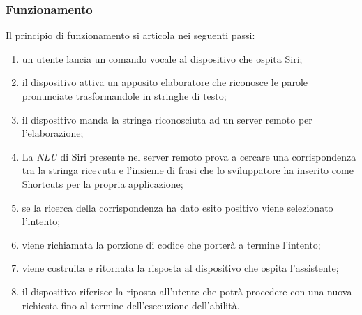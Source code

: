		\subsubsection{Funzionamento}
		Il principio di funzionamento si articola nei seguenti passi:
		\begin{enumerate}
			\item un utente lancia un comando vocale al dispositivo che ospita Siri;
			\item il dispositivo attiva un apposito elaboratore che riconosce le parole pronunciate trasformandole in stringhe di testo;
			\item il dispositivo manda la stringa riconosciuta ad un server remoto per l'elaborazione;
			\item La \textit{NLU} di Siri presente nel server remoto prova a cercare una corrispondenza tra la stringa ricevuta e l'insieme di frasi che lo sviluppatore ha inserito come Shortcuts per la propria applicazione;
			\item se la ricerca della corrispondenza ha dato esito positivo viene selezionato l'intento;
			\item viene richiamata la porzione di codice che porterà a termine l'intento;
			\item viene costruita e ritornata la risposta al dispositivo che ospita l'assistente;
			\item il dispositivo riferisce la riposta all'utente che potrà procedere con una nuova richiesta fino al termine dell'esecuzione dell'abilità.
		\end{enumerate}
